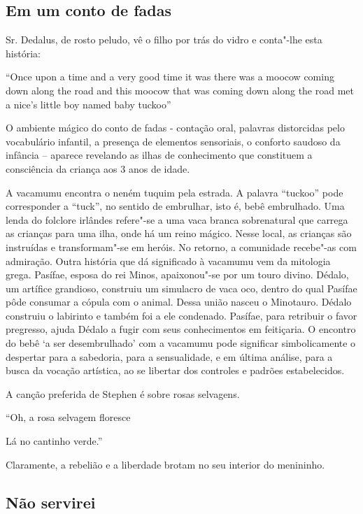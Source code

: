 \subsection{Em um conto de fadas}

Sr. Dedalus, de rosto peludo, vê o filho por trás do vidro e conta"-lhe
esta história:

``Once upon a time and a very good time it was there was a moocow coming
down along the road and this moocow that was coming down along the road
met a nice's little boy named baby tuckoo''

O ambiente mágico do conto de fadas - contação oral, palavras
distorcidas pelo vocabulário infantil, a presença de elementos
sensoriais, o conforto saudoso da infância -- aparece revelando as ilhas
de conhecimento que constituem a consciência da criança aos 3 anos de
idade.

A vacamumu encontra o neném tuquim pela estrada. A palavra ``tuckoo''
pode corresponder a ``tuck'', no sentido de embrulhar, isto é, bebê
embrulhado. Uma lenda do folclore irlândes refere"-se a uma vaca branca
sobrenatural que carrega as crianças para uma ilha, onde há um reino
mágico. Nesse local, as crianças são instruídas e transformam"-se em
heróis. No retorno, a comunidade recebe"-as com admiração. Outra história
que dá significado à vacamumu vem da mitologia grega. Pasífae, esposa do
rei Minos, apaixonou"-se por um touro divino. Dédalo, um artífice
grandioso, construiu um simulacro de vaca oco, dentro do qual Pasífae
pôde consumar a cópula com o animal. Dessa união nasceu o Minotauro.
Dédalo construiu o labirinto e também foi a ele condenado. Pasífae, para
retribuir o favor pregresso, ajuda Dédalo a fugir com seus conhecimentos
em feitiçaria. O encontro do bebê `a ser desembrulhado' com a vacamumu
pode significar simbolicamente o despertar para a sabedoria, para a
sensualidade, e em última análise, para a busca da vocação artística, ao
se libertar dos controles e padrões estabelecidos.

A canção preferida de Stephen é sobre rosas selvagens.

``Oh, a rosa selvagem floresce

Lá no cantinho verde.''

Claramente, a rebelião e a liberdade brotam no seu interior do
menininho.

\subsection{Não servirei}

